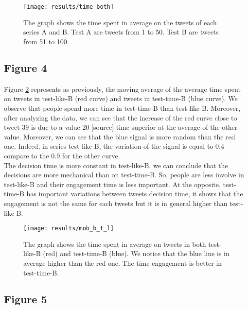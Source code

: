\begin{figure}[h] 
\centering 
\texttt{[image: results/time\_both]} 
\caption[Average time on the 100 tweets]{The graph shows the time spent in average on the tweets of each series A and B. Test A are tweets from 1 to 50. Test B are tweets from 51 to 100.}
\label{fig:time_both} 
\end{figure}


\subsection{Figure 4}

\paragraph{}
Figure \ref{fig:mob_b_t_l} represents as previously, the moving average of the average time spent on tweets in test-like-B (red curve) and tweets in test-time-B (blue curve). We observe that people spend more time in test-time-B than test-like-B. Moreover, after analyzing the data, we can see that the increase of the red curve close to tweet 39 is due to a value 20 [source] time superior at the average of the other value.
Moreover, we can see that the blue signal is more random than the red one. Indeed, in series test-like-B, the variation of the signal is equal to 0.4 compare to the 0.9 for the other curve.\\
The decision time is more constant in test-like-B, we can conclude that the decisions are more mechanical than on test-time-B. So,  people are less involve in test-like-B and their engagement time is less important. At the opposite, test-time-B has important variations between tweets decision time, it shows that the engagement is not the same for each tweets but it is in general higher than test-like-B.

\begin{figure}[h] 
\centering 
\texttt{[image: results/mob\_b\_t\_l]} 
\caption[Time engagement in tests B]{The graph shows the time spent in average on tweets in both test-like-B (red) and test-time-B (blue). We notice that the blue line is in average higher than the red one. The time engagement is better in test-time-B.}
\label{fig:mob_b_t_l} 
\end{figure}


\subsection{Figure 5}


